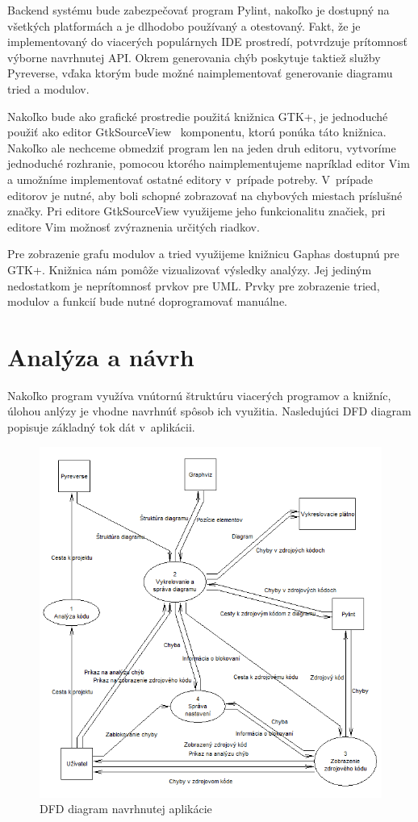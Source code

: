 \documentclass[11pt,oneside,final]{fithesis2}
\begin{document}
		Backend systému bude zabezpečovať program Pylint, nakoľko je dostupný na všetkých platformách a je dlhodobo používaný a otestovaný. Fakt, že je implementovaný do viacerých populárnych IDE prostredí, potvrdzuje prítomnosť výborne navrhnutej API. Okrem generovania chýb poskytuje taktiež služby Pyreverse, vďaka ktorým bude možné naimplementovať generovanie diagramu tried a modulov.
		
		Nakoľko bude ako grafické prostredie použitá knižnica GTK+, je jednoduché použiť ako editor GtkSourceView~\cite{gtksourceview} komponentu, ktorú ponúka táto knižnica. Nakoľko ale nechceme obmedziť program len na jeden druh editoru, vytvoríme jednoduché rozhranie, pomocou ktorého naimplementujeme napríklad editor Vim a umožníme implementovať ostatné editory v~prípade potreby. V~prípade editorov je nutné, aby boli schopné zobrazovať na chybových miestach príslušné značky. Pri editore GtkSourceView využijeme jeho funkcionalitu značiek, pri editore Vim možnosť zvýraznenia určitých riadkov.
		
		Pre zobrazenie grafu modulov a tried využijeme knižnicu Gaphas dostupnú pre GTK+. Knižnica nám pomôže vizualizovať výsledky analýzy. Jej jediným nedostatkom je neprítomnosť prvkov pre UML. Prvky pre zobrazenie tried, modulov a funkcií bude nutné doprogramovať manuálne.


	\section{Analýza a návrh}
	
	Nakoľko program využíva vnútornú štruktúru viacerých programov a knižníc, úlohou anlýzy je vhodne navrhnúť spôsob ich využitia. Nasledujúci DFD diagram popisuje základný tok dát v~aplikácii. 	
	
	\begin{figure}[htb]
	 \centering
	 \includegraphics[width=\textwidth]{images/dfd_main}
	 \caption{DFD diagram navrhnutej aplikácie}
	\end{figure}
	
\end{document}
